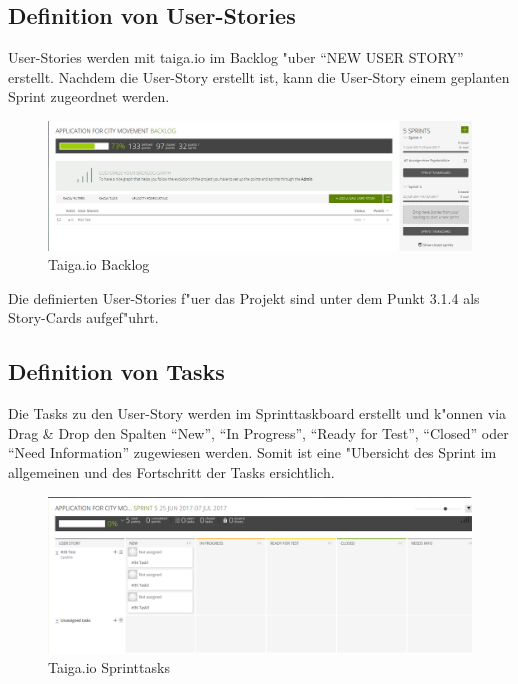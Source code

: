 \documentclass[a4paper, 11pt]{scrreprt}
\begin{document}
\subsection{Definition von User-Stories}

User-Stories werden mit taiga.io im Backlog "uber "`NEW USER STORY"' erstellt. Nachdem die User-Story erstellt ist, kann die User-Story einem geplanten Sprint zugeordnet werden.

\begin{figure} [H]
\begin{center}

\includegraphics[width=16cm]{backlog.png}
\caption{Taiga.io Backlog}

\end{center}
\end{figure}

Die definierten User-Stories f"uer das Projekt sind unter dem Punkt 3.1.4 als Story-Cards aufgef"uhrt.


\subsection{Definition von Tasks}

Die Tasks zu den User-Story werden im Sprinttaskboard erstellt und k"onnen via Drag \& Drop den Spalten "`New"', "`In Progress"', "`Ready for Test"', "`Closed"' oder "`Need Information"' zugewiesen werden. Somit ist eine "Ubersicht des Sprint im allgemeinen und des Fortschritt der Tasks ersichtlich.

\begin{figure} [H]
\begin{center}

\includegraphics[width=16cm]{sprint_tasks.png}
\caption{Taiga.io Sprinttasks}

\end{center}
\end{figure}
\end{document}
